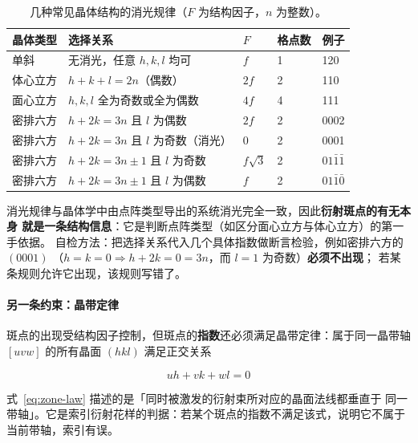 \begin{table}[htbp]
\centering
\caption{几种常见晶体结构的消光规律（$F$ 为结构因子，$n$ 为整数）。}
\label{tab:extinction-ch02}
{\srcsize
\begin{tabularx}{\columnwidth}{@{}lXlll@{}}
\toprule
晶体类型 & 选择关系 & $F$ & 格点数 & 例子 \\
\midrule
单斜 & 无消光，任意 $h,k,l$ 均可 & $f$ & 1 & 120 \\
体心立方 & $h+k+l=2n$（偶数） & $2f$ & 2 & 110 \\
面心立方 & $h,k,l$ 全为奇数或全为偶数 & $4f$ & 4 & 111 \\
密排六方 & $h+2k=3n$ 且 $l$ 为偶数 & $2f$ & 2 & 0002 \\
密排六方 & $h+2k=3n$ 且 $l$ 为奇数（消光） & $0$ & 2 & 0001 \\
密排六方 & $h+2k=3n\pm1$ 且 $l$ 为奇数 & $f\sqrt{3}$ & 2 & $01\bar{1}\bar{1}$ \\
密排六方 & $h+2k=3n\pm1$ 且 $l$ 为偶数 & $f$ & 2 & $01\bar{1}\bar{0}$ \\
\bottomrule
\end{tabularx}}
\end{table}

消光规律与晶体学中由点阵类型导出的系统消光完全一致，因此\textbf{衍射斑点的有无本身
就是一条结构信息}：它是判断点阵类型（如区分面心立方与体心立方）的第一手依据。
自检方法：把选择关系代入几个具体指数做断言检验，例如密排六方的 $(0001)$
（$h=k=0\Rightarrow h+2k=0=3n$，而 $l=1$ 为奇数）\textbf{必须不出现}；
若某条规则允许它出现，该规则写错了。

\paragraph{另一条约束：晶带定律}
斑点的出现受结构因子控制，但斑点的\textbf{指数}还必须满足晶带定律：属于同一晶带轴
$[uvw]$ 的所有晶面 $(hkl)$ 满足正交关系

\begin{equation}\label{eq:zone-law}
uh+vk+wl=0
\end{equation}

\begin{keycond}
式~\eqref{eq:zone-law} 描述的是「同时被激发的衍射束所对应的晶面法线都垂直于
同一带轴」。它是索引衍射花样的判据：若某个斑点的指数不满足该式，说明它不属于
当前带轴，索引有误。
\end{keycond}

